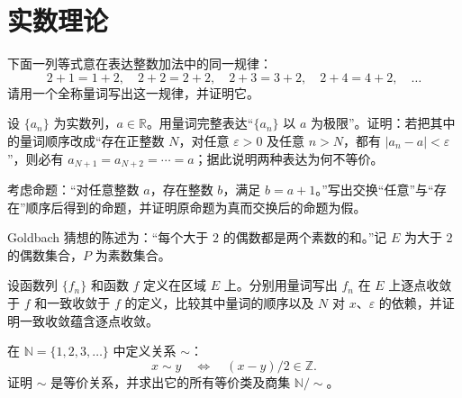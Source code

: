 \renewcommand{\thesection}{\arabic{section}}\renewcommand{\theHsection}{chapter.\arabic{section}}\setcounter{section}{13}\section{实数理论}
\noindent\begin{minipage}{\textwidth}
下面一列等式意在表达整数加法中的同一规律：\[2+1=1+2,\quad 2+2=2+2,\quad 2+3=3+2,\quad 2+4=4+2,\quad\ldots\]请用一个全称量词写出这一规律，并证明它。
\end{minipage}\par\vfill
\noindent\begin{minipage}{\textwidth}
设 $\{a_n\}$ 为实数列，$a\in\mathbb R$。用量词完整表达“$\{a_n\}$ 以 $a$ 为极限”。证明：若把其中的量词顺序改成“存在正整数 $N$，对任意 $\varepsilon>0$ 及任意 $n>N$，都有 $|a_n-a|<\varepsilon$”，则必有 $a_{N+1}=a_{N+2}=\cdots=a$；据此说明两种表达为何不等价。
\end{minipage}\par\vfill
\noindent\begin{minipage}{\textwidth}
考虑命题：“对任意整数 $a$，存在整数 $b$，满足 $b=a+1$。”写出交换“任意”与“存在”顺序后得到的命题，并证明原命题为真而交换后的命题为假。
\end{minipage}\par\vfill
\noindent\begin{minipage}{\textwidth}
Goldbach 猜想的陈述为：“每个大于 $2$ 的偶数都是两个素数的和。”记 $E$ 为大于 $2$ 的偶数集合，$P$ 为素数集合。
\end{minipage}\par\vfill
\newpage
\noindent\begin{minipage}{\textwidth}
设函数列 $\{f_n\}$ 和函数 $f$ 定义在区域 $E$ 上。分别用量词写出 $f_n$ 在 $E$ 上逐点收敛于 $f$ 和一致收敛于 $f$ 的定义，比较其中量词的顺序以及 $N$ 对 $x$、$\varepsilon$ 的依赖，并证明一致收敛蕴含逐点收敛。
\end{minipage}\par\vfill
\noindent\begin{minipage}{\textwidth}
在 $\mathbb N=\{1,2,3,\ldots\}$ 中定义关系 $\sim$：\[x\sim y\quad\Longleftrightarrow\quad(x-y)/2\in\mathbb Z.\]证明 $\sim$ 是等价关系，并求出它的所有等价类及商集 $\mathbb N/\!\sim$。
\end{minipage}\par\vfill
